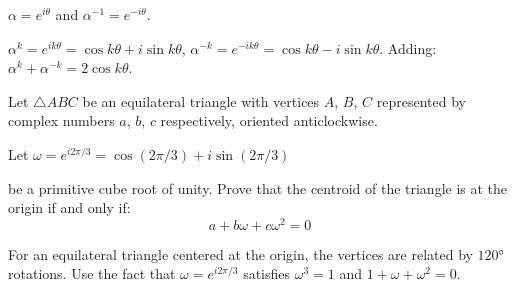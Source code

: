 \begin{hint}
$\alpha = e^{i\theta}$ and $\alpha^{-1} = e^{-i\theta}$.
\end{hint}

\begin{solution}[Sketch]
$\alpha^k = e^{ik\theta} = \cos k\theta + i\sin k\theta$, $\alpha^{-k} = e^{-ik\theta} = \cos k\theta - i\sin k\theta$. Adding: $\alpha^k + \alpha^{-k} = 2\cos k\theta$.
\end{solution}

\begin{problem}
Let $\triangle ABC$ be an equilateral triangle with vertices 
$A$, $B$, $C$ represented by complex numbers 
$a$, $b$, $c$ respectively, oriented anticlockwise. 

Let $\omega = e^{i2\pi/3} = \cos (2\pi/3) + i\sin (2\pi/3)$ 

be a primitive cube root of unity. Prove that the centroid of the triangle is at the origin if and only if:
\[
a + b\omega + c\omega^2 = 0
\]
\end{problem}

\begin{hint}
For an equilateral triangle centered at the origin, the vertices are related by $120°$ rotations. Use the fact that $\omega = e^{i2\pi/3}$ satisfies $\omega^3 = 1$ and $1 + \omega + \omega^2 = 0$.
\end{hint}

